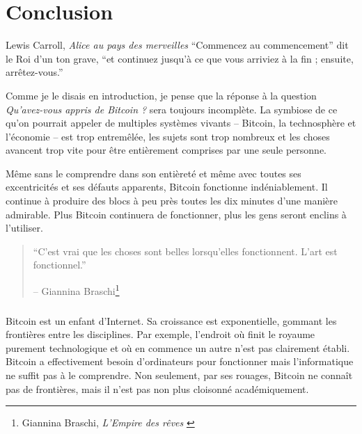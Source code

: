 \label{ch:conclusion}

\chapter*{Conclusion}

\begin{chapquote}{Lewis Carroll, \textit{Alice au pays des merveilles}}
\enquote{Commencez au commencement}  dit le Roi d’un ton grave, \enquote{et
continuez jusqu’à ce que vous arriviez à la fin ; ensuite, arrêtez-vous.}
\end{chapquote}

Comme je le disais en introduction, je pense que la réponse à la question
\textit{Qu'avez-vous appris de Bitcoin ?} sera toujours incomplète. La symbiose
de ce qu'on pourrait appeler de multiples systèmes vivants -- Bitcoin, la
technosphère et l'économie -- est trop entremêlée, les sujets sont trop nombreux
et les choses avancent trop vite pour être entièrement comprises par une seule
personne.

Même sans le comprendre dans son entièreté et même avec toutes ses excentricités
et ses défauts apparents, Bitcoin fonctionne indéniablement. Il continue à
produire des blocs à peu près toutes les dix minutes d'une manière admirable.
Plus Bitcoin continuera de fonctionner, plus les gens seront enclins à
l'utiliser.

\begin{quotation}\begin{samepage}
\enquote{C'est vrai que les choses sont belles lorsqu'elles fonctionnent. L'art
est fonctionnel.}
\begin{flushright} -- Giannina Braschi\footnote{Giannina Braschi,
\textit{L'Empire des rêves} \cite{braschi2011empire}}
\end{flushright}\end{samepage}\end{quotation}

\paragraph{} Bitcoin est un enfant d'Internet. Sa croissance est exponentielle,
gommant les frontières entre les disciplines. Par exemple, l'endroit où finit le
royaume purement technologique et où en commence un autre n'est pas clairement
établi. Bitcoin a effectivement besoin d'ordinateurs pour fonctionner mais
l'informatique ne suffit pas à le comprendre. Non seulement, par ses rouages,
Bitcoin ne connaît pas de frontières, mais il n'est pas non plus cloisonné
académiquement.

